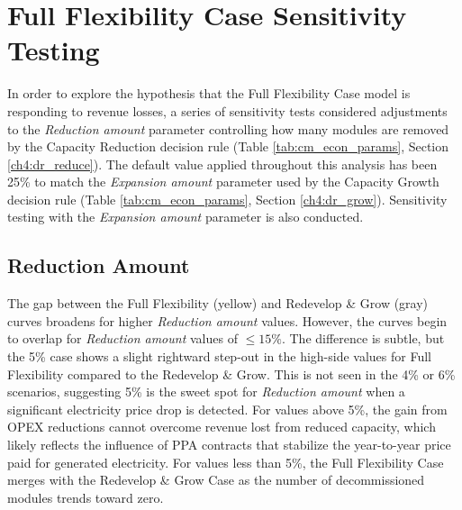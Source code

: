 \section{Full Flexibility Case Sensitivity Testing}\label{ch6:sensitivity}

In order to explore the hypothesis that the Full Flexibility Case model is responding to revenue losses, a series of sensitivity tests considered adjustments to the \textit{Reduction amount} parameter controlling how many modules are removed by the Capacity Reduction decision rule (Table \ref{tab:cm_econ_params}, Section \ref{ch4:dr_reduce}). The default value applied throughout this analysis has been 25\% to match the \textit{Expansion amount} parameter used by the Capacity Growth decision rule (Table \ref{tab:cm_econ_params}, Section \ref{ch4:dr_grow}). Sensitivity testing with the \textit{Expansion amount} parameter is also conducted.

\subsection{Reduction Amount}\label{ch6:sens_redamt}

The gap between the Full Flexibility (yellow) and Redevelop \& Grow (gray) curves broadens for higher \textit{Reduction amount} values. However, the curves begin to overlap for \textit{Reduction amount} values of $\leq{15}\%$. The difference is subtle, but the 5\% case shows a slight rightward step-out in the high-side values for Full Flexibility compared to the Redevelop \& Grow. This is not seen in the 4\% or 6\% scenarios, suggesting 5\% is the sweet spot for \textit{Reduction amount} when a significant electricity price drop is detected. For values above 5\%, the gain from OPEX reductions cannot overcome revenue lost from reduced capacity, which likely reflects the influence of PPA contracts that stabilize the year-to-year price paid for generated electricity. For values less than 5\%, the Full Flexibility Case merges with the Redevelop \& Grow Case as the number of decommissioned modules trends toward zero.

